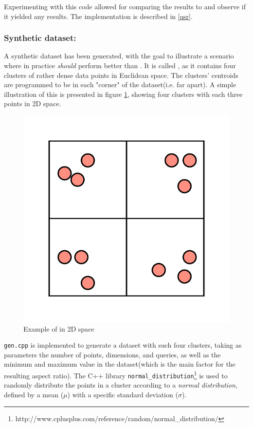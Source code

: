 Experimenting with this code allowed for comparing the results to \qs{} and observe if it yielded any results. The implementation is described in \ref{qsr}.


\subsubsection{Synthetic dataset: \clust{}}
\label{clusters}
A synthetic dataset has been generated, with the goal to illustrate a scenario where \qsr{} in practice \textit{should} perform better than \qs{}. It is called \clust{}, as it contains four clusters of rather dense data points in Euclidean space. The clusters' centroids are programmed to be in each "corner" of the dataset(i.e. far apart). A simple illustration of this is presented in figure \ref{fig:clusters}, showing four clusters with each three points in 2D space.

\begin{figure}[h]
	\centering
	\includegraphics[scale=0.5]{figures/Clusters_example.png}
	\caption{Example of \clust{} in 2D space}
	\label{fig:clusters}
\end{figure}


\texttt{gen.cpp} is implemented to generate a dataset with such four clusters, taking as parameters the number of points, dimensions, and queries, as well as the minimum and maximum value in the dataset(which is the main factor for the resulting aspect ratio). The C++ library \texttt{normal\_distribution}\footnote{http://www.cplusplus.com/reference/random/normal\_distribution/} is used to randomly distribute the points in a cluster according to a \textit{normal distribution}, defined by a mean ($\mu$) with a specific standard deviation ($\sigma$). 

